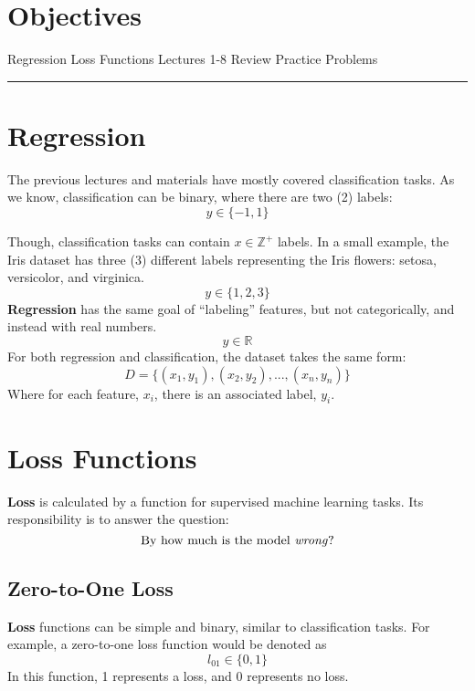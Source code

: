 
\section*{Objectives}
\begin{outline}
    \1 Regression
    \1 Loss Functions
    \1 Lectures 1-8 Review
    \1 Practice Problems
\end{outline}

\rule[0.0051in]{\textwidth}{0.00025in}


\section{Regression}
The previous lectures and materials have mostly covered classification tasks. As we know, classification can be binary, where there are two (2) labels: 
\[
y \in \{-1, 1\}
\]

Though, classification tasks can contain $x\mathbb{\in Z^+}$ labels. In a small example, the Iris dataset has three (3) different labels representing the Iris flowers: setosa, versicolor, and virginica.
\[
y \in \{1, 2, 3\}
\]
\textbf{Regression} has the same goal of ``labeling'' features, but not categorically, and instead with real numbers.
\[
y \in \mathbb{R}
\]
For both regression and classification, the dataset takes the same form:
\[
D = \{(x_1, y_1), (x_2, y_2),...,(x_n, y_n)\}
\]
Where for each feature, $x_i$, there is an associated label, $y_i$.
\section{Loss Functions}
\textbf{Loss} is calculated by a function for supervised machine learning tasks. Its responsibility is to answer the question: 
\[
\text{By how much is the model \textit{wrong}?}
\]

\subsection{Zero-to-One Loss}
\textbf{Loss} functions can be simple and binary, similar to classification tasks. For example, a zero-to-one loss function would be denoted as
\[
l_{01} \in \{0, 1\}
\]
In this function, 1 represents a loss, and 0 represents no loss.

